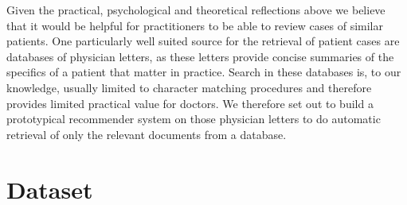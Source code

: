
Given the practical, psychological and theoretical reflections above we believe that it would be helpful for practitioners to be able to review cases of similar patients. One particularly well suited source for the retrieval of patient cases are databases of physician letters, as these letters provide concise summaries of the specifics of a patient that matter in practice. Search in these databases is, to our knowledge, usually limited to character matching procedures and therefore provides limited practical value for doctors. We therefore set out to build a prototypical recommender system on those physician letters to do automatic retrieval of only the relevant documents from a database.


\section{Dataset}

